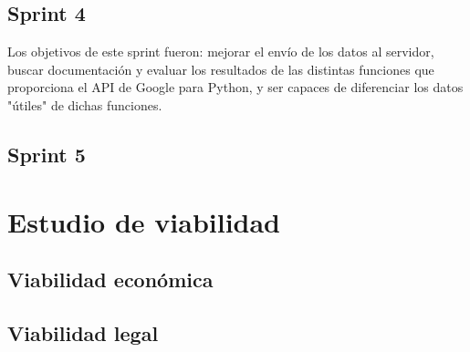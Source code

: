 \subsection{Sprint 4}
Los objetivos de este sprint fueron: mejorar el envío de los datos al servidor, buscar documentación y evaluar los resultados de las distintas funciones que proporciona el API de Google para Python, y ser capaces de diferenciar los datos "útiles" de dichas funciones.


\subsection{Sprint 5}


\section{Estudio de viabilidad}

\subsection{Viabilidad económica}

\subsection{Viabilidad legal}


